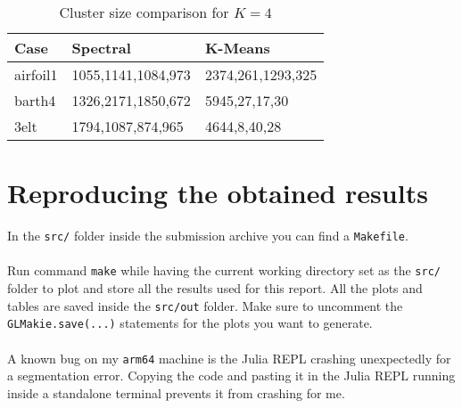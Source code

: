 \documentclass[unicode,11pt,a4paper,oneside,numbers=endperiod,openany]{scrartcl}
\begin{document}
\begin{table}[h!]
    \centering
    \begin{tabular}{l|ll}
    Case &           Spectral &           K-Means \\ \hline
airfoil1 & 1055,1141,1084,973 & 2374,261,1293,325 \\
barth4 & 1326,2171,1850,672 &     5945,27,17,30 \\
3elt &  1794,1087,874,965 &      4644,8,40,28 \\
    \end{tabular}
    \caption{Cluster size comparison for $K=4$}
\end{table}

\clearpage
\section{Reproducing the obtained results}
In the \verb|src/| folder inside the submission archive you can find a \verb|Makefile|.\\\\
Run command \verb|make| while having the current working directory set as the \verb|src/| folder to plot and store all the results used for this report. All the plots and tables are saved inside the \verb|src/out| folder. Make sure to uncomment the \verb|GLMakie.save(...)| statements for the plots you want to generate.\\\\
A known bug on my \verb|arm64| machine is the Julia REPL crashing unexpectedly for a segmentation error. Copying the code and pasting it in the Julia REPL running inside a standalone terminal prevents it from crashing for me.
\end{document}
